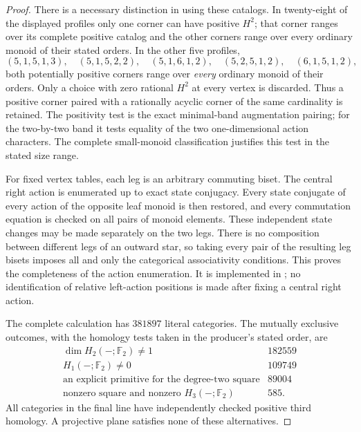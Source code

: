 \begin{proof}
There is a necessary distinction in using these catalogs.  In
twenty-eight of the displayed profiles only one corner can have
positive $H^2$; that corner ranges over its complete positive
catalog and the other corners range over every ordinary monoid
of their stated orders.  In the other five profiles,
\[
 (5,1,5,1,3),\quad(5,1,5,2,2),\quad(5,1,6,1,2),\quad
 (5,2,5,1,2),\quad(6,1,5,1,2),
\]
both potentially positive corners range over \emph{every} ordinary
monoid of their orders.  Only a choice with zero rational $H^2$
at every vertex is discarded.  Thus a positive corner paired with
a rationally acyclic corner of the same cardinality is retained.
The positivity test is the exact minimal-band augmentation
pairing; for the two-by-two band it tests equality of the two
one-dimensional action characters.  The complete small-monoid
classification justifies this test in the stated size range.

For fixed vertex tables, each leg is an arbitrary commuting
biset.  The central right action is enumerated up to exact state
conjugacy.  Every state conjugate of every action of the opposite
leaf monoid is then restored, and every commutation equation is
checked on all pairs of monoid elements.  These independent
state changes may be made separately on the two legs.  There
is no composition between different legs of an outward star,
so taking every pair of the resulting leg bisets imposes all
and only the categorical associativity conditions.  This proves
the completeness of the action enumeration.  It is implemented
in ; no identification of
relative left-action positions is made after fixing a central
right action.

The complete calculation has $381897$ literal categories.
The mutually exclusive outcomes, with the homology tests taken
in the producer's stated order, are
\[
\begin{array}{l|r}
\dim H_2(-;\mathbb F_2)\ne1&182559\\
H_1(-;\mathbb F_2)\ne0&109749\\
\text{an explicit primitive for the degree-two square}&89004\\
\text{nonzero square and nonzero }H_3(-;\mathbb F_2)&585.
\end{array}
\]
All categories in the final line have independently checked
positive third homology.  A projective plane satisfies none of
these alternatives.


\end{proof}
